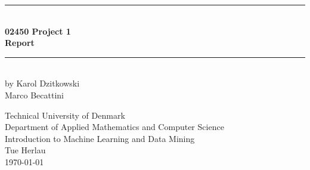\begin{titlingpage}
\centering \parindent=0pt
\newcommand{\HRule}{\rule{\textwidth}{1mm}}
 \HRule\\[1cm]\Huge\bfseries
02450 Project 1\\[0.7cm]
\large Report\\[1cm]
\HRule\\[4cm]  
\large by Karol Dzitkowski\\
Marco Becattini\\
 \normalsize %
\begin{flushleft}
Technical University of Denmark\\
Department of Applied Mathematics and Computer Science\\
Introduction to Machine Learning and Data Mining\\
Tue Herlau\\
\today \end{flushleft}
\end{titlingpage}
